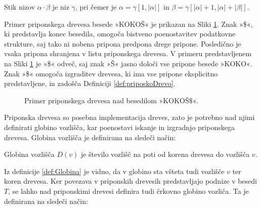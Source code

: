 \begin{defi}
    Stik nizov $\alpha\cdot\beta$ je niz $\gamma$, pri čemer je $\alpha=\gamma[1,|\alpha|]$ in $\beta=\gamma[|\alpha|+1,|\alpha|+|\beta|]$.
\end{defi}



Primer priponskega drevesa besede »KOKOŠ« je prikazan na Sliki \ref{fig:PriponskoDrevo}. Znak »\$«, ki predstavlja konec besedila, omogoča bistveno poenostavitev podatkovne strukture, saj tako ni nobena pripona predpona drege pripone. Posledično je vsaka pripona shranjena v listu priponskega drevesa. V primeru predstavljenem na Sliki \ref{fig:PriponskoDrevo} je »\$« odveč, saj znak »Š« jasno določi vse pripone besede »KOKO«. Znak »\$« omogoča izgraditev drevesa, ki ima vse pripone eksplicitno predstavljene, in zadošča Definiciji \ref{def:priposkoDrevo}.

\begin{figure}[htb]
    \begin{center}
        
        \caption{Primer priponskega drevesa nad besedilom »KOKOŠ$\$$«.} 
        \label{fig:PriponskoDrevo}
    \end{center}
\end{figure}


Priponska drevesa so posebna implementacija dreves, zato je potrebno nad njimi definirati globino vozlišča, kar poenostavi iskanje in izgradnjo priponskega drevesa. Globina vozlišča je definirana na sledeči način:

\begin{defi}\label{def:Globina}
   Globina vozlišča $D(v)$ je število vozlišč na poti od korena drevesa do vozlišča $v$. 
\end{defi}

Iz definicije \ref{def:Globina} je vidno, da v globino sta všteta tudi vozlišče $v$ ter koren drevesa. 
Ker povezava v priponskih drevesih predstavljajo podnize v besedi $T$, se lahko nad priponskimi drevesi definira tudi črkovno globino vozliča. Ta je definirana na sledeči način:



